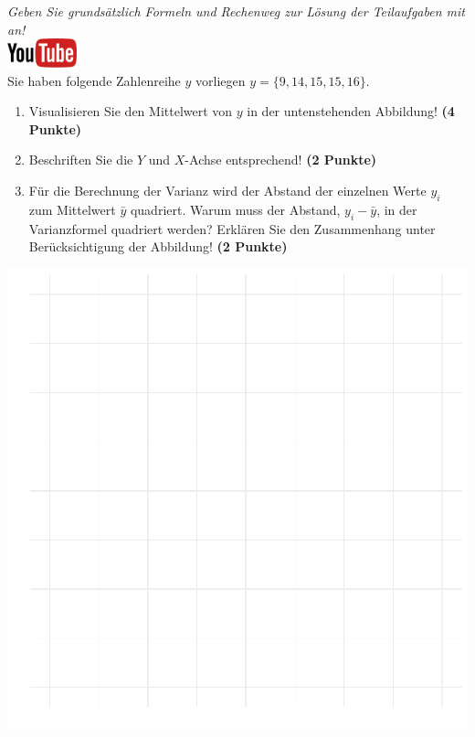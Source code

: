 \documentclass[a4paper, 9pt]{scrartcl}\usepackage[]{graphicx}\usepackage[]{xcolor}
\makeatletter
\def\maxwidth{ %
  \ifdim\Gin@nat@width>\linewidth
    \linewidth
  \else
    \Gin@nat@width
  \fi
}
\makeatother
\begin{document}
\textit{Geben Sie grunds{\"a}tzlich Formeln und Rechenweg zur L{\"o}sung der
  Teilaufgaben mit an!} \\[1Ex]

\hfill\href{https://youtu.be/oMdtYbDInYE}{\includegraphics[width =
  2cm]{img/youtube}}\\[1Ex]

Sie haben folgende Zahlenreihe $y$ vorliegen
$y = \{9, 14, 15, 15, 16\}$.

\begin{enumerate}
\item Visualisieren Sie den Mittelwert von $y$ in der untenstehenden
  Abbildung! \textbf{(4 Punkte)}
\item Beschriften Sie die $Y$ und $X$-Achse entsprechend! \textbf{(2 Punkte)}
\item F{\"u}r die Berechnung der Varianz wird der Abstand der einzelnen Werte $y_i$
  zum Mittelwert $\bar{y}$ quadriert. Warum muss der Abstand, $y_i -
  \bar{y}$, in der Varianzformel quadriert werden?
  Erkl{\"a}ren Sie den Zusammenhang unter Ber{\"u}cksichtigung der Abbildung!
  \textbf{(2 Punkte)}  
\end{enumerate}



{\centering \includegraphics[width=\maxwidth]{img/desc-01-1} 

}
\end{document}
